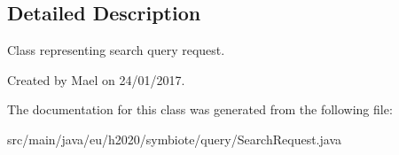 \subsection{Detailed Description}
Class representing search query request.

Created by Mael on 24/01/2017. 

The documentation for this class was generated from the following file\+:\begin{DoxyCompactItemize}
\item 
src/main/java/eu/h2020/symbiote/query/Search\+Request.\+java\end{DoxyCompactItemize}
